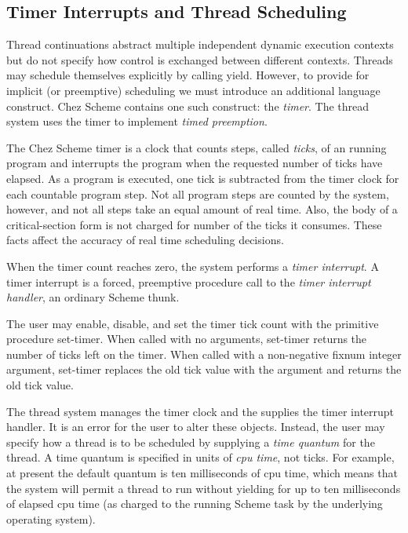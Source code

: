 \documentclass{article}
\begin{document}

\subsection{Timer Interrupts and Thread Scheduling}

Thread continuations abstract multiple independent dynamic execution
contexts but do not specify how control is exchanged between different
contexts.  Threads may schedule themselves explicitly by calling {\sf
yield}.  However, to provide for implicit (or preemptive) scheduling
we must introduce an additional language construct.  Chez Scheme
contains one such construct: the {\em timer}.  The thread system uses
the timer to implement {\em timed preemption}.

The Chez Scheme timer is a clock that counts steps, called {\em
ticks}, of an running program and interrupts the program when the
requested number of ticks have elapsed.  As a program is executed, one
tick is subtracted from the timer clock for each countable program
step. Not all program steps are counted by the system, however, and
not all steps take an equal amount of real time. Also, the body of a
{\sf critical-section} form is not charged for number of the ticks it
consumes.  These facts affect the accuracy of real time scheduling
decisions.

When the timer count reaches zero, the system performs a {\em timer
interrupt}. A timer interrupt is a forced, preemptive procedure call
to the {\em timer interrupt handler}, an ordinary Scheme thunk.

The user may enable, disable, and set the timer tick count with the
primitive procedure {\sf set-timer}.  When called with no arguments,
{\sf set-timer} returns the number of ticks left on the timer.  When
called with a non-negative fixnum integer argument, {\sf set-timer}
replaces the old tick value with the argument and returns the old tick
value.

The thread system manages the timer clock and the supplies the timer
interrupt handler.  It is an error for the user to alter these
objects.  Instead, the user may specify how a thread is to be
scheduled by supplying a {\em time quantum\/} for the thread.  A time
quantum is specified in units of {\em cpu time}, not ticks.  For
example, at present the default quantum is ten milliseconds of cpu
time, which means that the system will permit a thread to run without
yielding for up to ten milliseconds of elapsed cpu time (as charged to
the running Scheme task by the underlying operating system).
\end{document}
